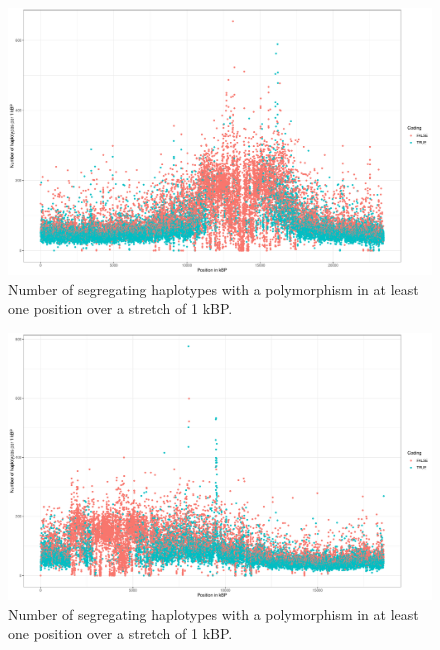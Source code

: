 \begin{figure}[th]
\centering
\includegraphics[height=.55\textheight, width=1.1\textwidth]{Figures/chr3_hap}
\decoRule
\caption[Haplotype strutcture of chromosome 3 of \textit{A. thaliana}]{Number of segregating haplotypes with a polymorphism in at least one position over a stretch of 1 kBP. }
\label{fig:chr3}
\end{figure}


\begin{figure}[th]
\centering
\includegraphics[height=.55\textheight, width=1.1\textwidth]{Figures/chr4_hap}
\decoRule
\caption[Haplotype strutcture of chromosome 4 of \textit{A. thaliana}]{Number of segregating haplotypes with a polymorphism in at least one position over a stretch of 1 kBP. }
\label{fig:chr4}
\end{figure}


